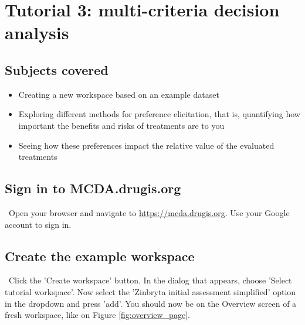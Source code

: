 \documentclass[00_mcda_tutorial.tex]{subfiles}
\begin{document}
\section*{Tutorial 3: multi-criteria decision analysis}
\addtocounter{section}{1}

\subsection*{Subjects covered}
\begin{itemize}
\item Creating a new workspace based on an example dataset
\item Exploring different methods for preference elicitation, that is, quantifying how important the benefits and risks of treatments are to you
\item Seeing how these preferences impact the relative value of the evaluated treatments
\end{itemize}

\subsection*{Sign in to MCDA.drugis.org}
\leftpointright \, Open your browser and navigate to \href{https://mcda.drugis.org}{https://mcda.drugis.org}. Use your Google account to sign in.

\subsection*{Create the example workspace}
\leftpointright \, Click the 'Create workspace' button. In the dialog that appears, choose 'Select tutorial workspace'. Now select the 'Zinbryta initial assessment simplified' option in the dropdown and press 'add'. You should now be on the Overview screen of a fresh workspace, like on Figure \ref{fig:overview_page}.
\newline
\end{document}
